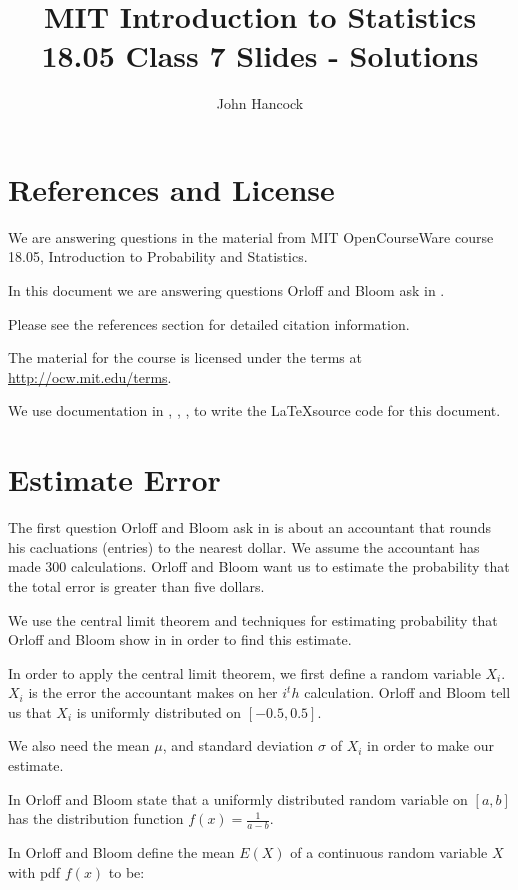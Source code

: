 \documentclass[a4paper,11pt]{article}
\author{John Hancock}
\title{MIT Introduction to Statistics 18.05 Class 7 Slides - Solutions}
\begin{document}
\maketitle
\tableofcontents
\section{References and License}
We are answering questions in the material from MIT OpenCourseWare
course 18.05, Introduction to Probability and Statistics.

In this document we are answering questions Orloff and Bloom ask in
\cite{slides7}.

Please see the references section for detailed citation information.

The material for the course is licensed under the terms at
\url{http://ocw.mit.edu/terms}.

We use documentation in  \cite{logicNot}, \cite{proofs}, \cite{bars},
\cite{packageClash} to write the \LaTeX source code for this document.

\section{Estimate Error}
The first question Orloff and Bloom ask in \cite{slides7} is about an
accountant that rounds his cacluations (entries) to the nearest dollar.  We
assume the accountant has made 300 calculations.  Orloff and Bloom want us
to estimate the probability that the total error is greater than five
dollars.

We use the central limit theorem \cite{reading6b} and techniques for estimating
probability that Orloff and Bloom show in \cite{reading6b} in order to find
this estimate.

In order to apply the central limit theorem, we first define a random variable
$X_i$.  $X_i$ is the error the accountant makes on her $i^th$ calculation.
Orloff and Bloom tell us that $X_i$ is uniformly distributed on
$\left[-0.5, 0.5 \right]$.

We also need the mean $\mu$, and standard deviation $\sigma$ of $X_i$ in order
to make our estimate.

In \cite{reading5c} Orloff and Bloom state that a uniformly distributed random
variable on $\left[a, b \right]$ has the distribution function
$f\left(x \right) = \frac{1}{a-b}$.

In \cite{reading6a} Orloff and Bloom define the mean $E\left(X \right)$ of a
continuous random variable $X$ with pdf $f\left(x \right)$ to be:
\end{document}
